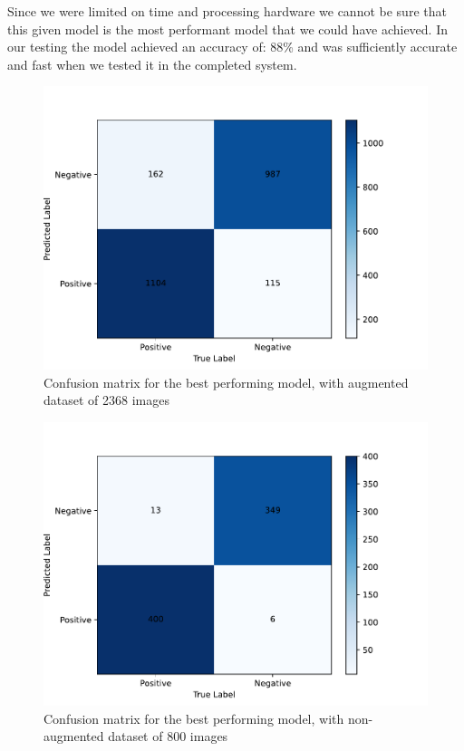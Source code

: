 \documentclass[12pt,a4paper,english
]{tunithesis}
\begin{document}
Since we were limited on time and processing hardware we cannot be sure that this given model is the most performant model that we could have achieved. In our testing the model achieved an accuracy of: 88\% and was sufficiently accurate and fast when we tested it in the completed system.

\begin{figure}
  \centering
  \includegraphics[width=\columnwidth]{img/confusion_matrix_best.pdf}
  \caption{Confusion matrix for the best performing model, with augmented dataset of 2368 images}
  \label{fig:confusion_matrix_best}
\end{figure}

\begin{figure}
  \centering
  \includegraphics[width=\columnwidth]{img/confusion_matrix_small.pdf}
  \caption{Confusion matrix for the best performing model, with non-augmented dataset of 800 images}
  \label{fig:confusion_matrix_small}
\end{figure}
\end{document}
